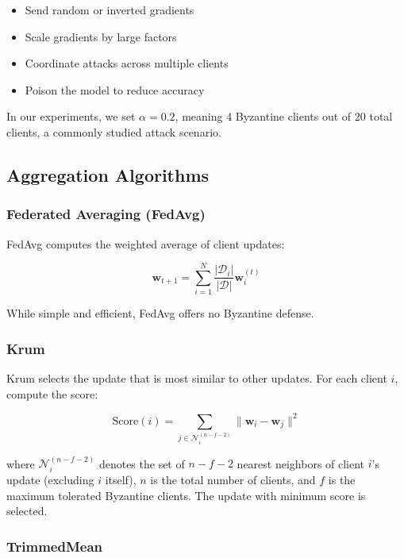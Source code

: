 \documentclass[12pt,a4paper,onecolumn]{article}
\begin{document}
\begin{itemize}
    \item Send random or inverted gradients
    \item Scale gradients by large factors
    \item Coordinate attacks across multiple clients
    \item Poison the model to reduce accuracy
\end{itemize}

In our experiments, we set $\alpha = 0.2$, meaning 4 Byzantine clients out of 20 total clients, a commonly studied attack scenario.

\subsection{Aggregation Algorithms}

\subsubsection{Federated Averaging (FedAvg)}

FedAvg computes the weighted average of client updates:

\begin{equation}
\mathbf{w}_{t+1} = \sum_{i=1}^{N} \frac{|\mathcal{D}_i|}{|\mathcal{D}|} \mathbf{w}_i^{(t)}
\label{eq:fedavg}
\end{equation}

While simple and efficient, FedAvg offers no Byzantine defense.

\subsubsection{Krum}

Krum selects the update that is most similar to other updates. For each client $i$, compute the score:

\begin{equation}
\text{Score}(i) = \sum_{j \in \mathcal{N}_i^{(n-f-2)}} \|\mathbf{w}_i - \mathbf{w}_j\|^2
\label{eq:krum_score}
\end{equation}

where $\mathcal{N}_i^{(n-f-2)}$ denotes the set of $n-f-2$ nearest neighbors of client $i$'s update (excluding $i$ itself), $n$ is the total number of clients, and $f$ is the maximum tolerated Byzantine clients. The update with minimum score is selected.

\subsubsection{TrimmedMean}
\end{document}
